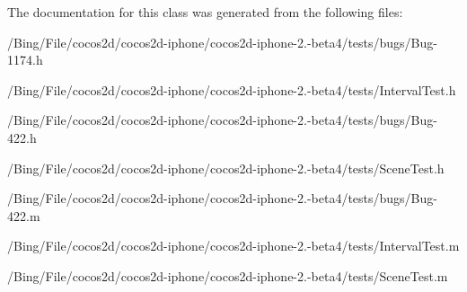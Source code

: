 The documentation for this class was generated from the following files\-:\begin{DoxyCompactItemize}
\item 
/\-Bing/\-File/cocos2d/cocos2d-\/iphone/cocos2d-\/iphone-\/2.-\/beta4/tests/bugs/Bug-\/1174.\-h\item 
/\-Bing/\-File/cocos2d/cocos2d-\/iphone/cocos2d-\/iphone-\/2.-\/beta4/tests/Interval\-Test.\-h\item 
/\-Bing/\-File/cocos2d/cocos2d-\/iphone/cocos2d-\/iphone-\/2.-\/beta4/tests/bugs/Bug-\/422.\-h\item 
/\-Bing/\-File/cocos2d/cocos2d-\/iphone/cocos2d-\/iphone-\/2.-\/beta4/tests/Scene\-Test.\-h\item 
/\-Bing/\-File/cocos2d/cocos2d-\/iphone/cocos2d-\/iphone-\/2.-\/beta4/tests/bugs/Bug-\/422.\-m\item 
/\-Bing/\-File/cocos2d/cocos2d-\/iphone/cocos2d-\/iphone-\/2.-\/beta4/tests/Interval\-Test.\-m\item 
/\-Bing/\-File/cocos2d/cocos2d-\/iphone/cocos2d-\/iphone-\/2.-\/beta4/tests/Scene\-Test.\-m\end{DoxyCompactItemize}
